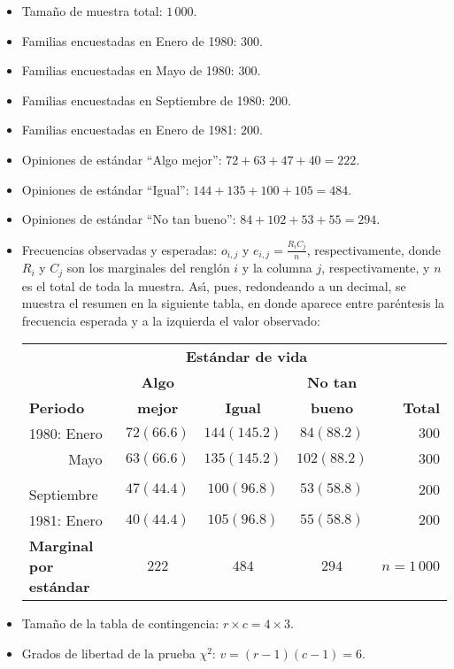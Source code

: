 \begin{solucion}
 \begin{datos}
  $\phantom{0}$
  \begin{itemize}
   \item Tamaño de muestra total: $1\,000$.
   \item Familias encuestadas en Enero de 1980: $300$.
   \item Familias encuestadas en Mayo de 1980: $300$.
   \item Familias encuestadas en Septiembre de 1980: $200$.
   \item Familias encuestadas en Enero de 1981: $200$.
   \item Opiniones de est\'andar ``Algo mejor'': $72+63+47+40 = 222$.
   \item Opiniones de est\'andar ``Igual'': $144+135+100+105 = 484$.
   \item Opiniones de est\'andar ``No tan bueno'': $84+102+53+55 = 294$.
   \item Frecuencias observadas y esperadas: $o_{i,j}$
   y $e_{i,j}=\frac{R_i C_j}{n}$, respectivamente,
   donde $R_i$ y $C_j$ son los marginales del rengl\'on $i$ y la columna $j$,
   respectivamente, y $n$ es el total de toda la muestra.
   As\'{\i}, pues, redondeando a un decimal, se muestra el resumen 
   en la siguiente tabla,
   en donde aparece entre par\'entesis la frecuencia esperada
   y a la izquierda el valor observado:
   \begin{center}
    \begin{tabular}{lcccr}
     & \multicolumn{3}{c}{\textbf{Est\'andar de vida}} & \\
     \cline{2-4}
     & \textbf{Algo} & & \textbf{No tan} & \\
     \textbf{Periodo} & \textbf{mejor} & \textbf{Igual} & \textbf{bueno} &
     \textbf{Total} \\
     \hline
     1980: Enero & $72 (66.6)$ & $144 (145.2)$ & $84 (88.2)$ & 
     $300$ \\
     $\phantom{1980:}$ Mayo & $63 (66.6)$ & $135 (145.2)$ & $102 (88.2)$ &
     $300$ \\
     $\phantom{1980:}$ Septiembre & $47(44.4)$ & $100(96.8)$ & $53(58.8)$ &
     $200$ \\
     1981: Enero & $40 (44.4)$ & $105 (96.8)$ & $55 (58.8)$ & 
     $200$ \\
     \hline
     \textbf{Marginal por est\'andar} & $222$ & $484$ & $294$ & $n=1\,000$
    \end{tabular}
   \end{center}
   \item Tama\~no de la tabla de contingencia: $r\times c = 4\times 3$.
   \item Grados de libertad de la prueba $\chi^2$: $v = (r-1)(c-1) = 6$.
  \end{itemize}
 \end{datos}
 

\end{solucion}

